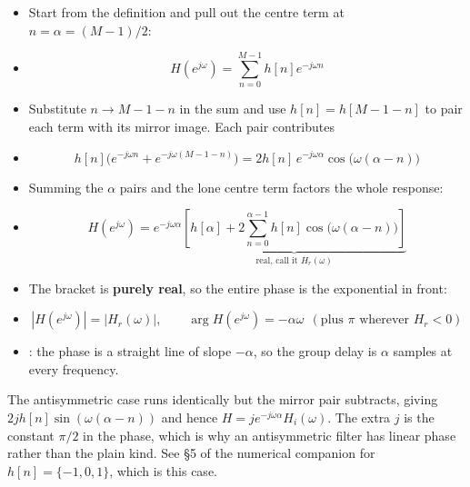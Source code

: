 \begin{itemize}
  \item Start from the definition and pull out the centre term at $n=\alpha=(M-1)/2$:
  \item[] \[ H(e^{j\omega})=\sum_{n=0}^{M-1}h[n]e^{-j\omega n} \]
  \item Substitute $n\to M-1-n$ in the sum and use $h[n]=h[M-1-n]$ to pair each term with
        its mirror image. Each pair contributes
  \item[] \[ h[n]\big(e^{-j\omega n}+e^{-j\omega(M-1-n)}\big)
             =2h[n]\,e^{-j\omega\alpha}\cos\!\big(\omega(\alpha-n)\big) \]
  \item Summing the $\alpha$ pairs and the lone centre term factors the whole response:
  \item[] \[ H(e^{j\omega})=e^{-j\omega\alpha}
             \underbrace{\left[h[\alpha]+2\sum_{n=0}^{\alpha-1}h[n]
             \cos\!\big(\omega(\alpha-n)\big)\right]}_{\text{real, call it }H_r(\omega)} \]
  \item The bracket is \textbf{purely real}, so the entire phase is the exponential in
        front:
  \item[] \[ |H(e^{j\omega})|=|H_r(\omega)|,\qquad
             \arg H(e^{j\omega})=-\alpha\omega\ \ (\text{plus }\pi\text{ wherever }H_r<0) \]
  \item {}: the phase is a straight line of slope $-\alpha$, so the
        group delay is $\alpha$ samples at every frequency.
\end{itemize}

{\color{sub}\footnotesize The antisymmetric case runs identically but the mirror pair
subtracts, giving $2jh[n]\sin(\omega(\alpha-n))$ and hence
$H=je^{-j\omega\alpha}H_i(\omega)$. The extra $j$ is the constant $\pi/2$ in the phase,
which is why an antisymmetric filter has  linear phase rather than the
plain kind. See \S5 of the numerical companion for $h[n]=\{-1,0,1\}$, which is this
case.}

\hr


